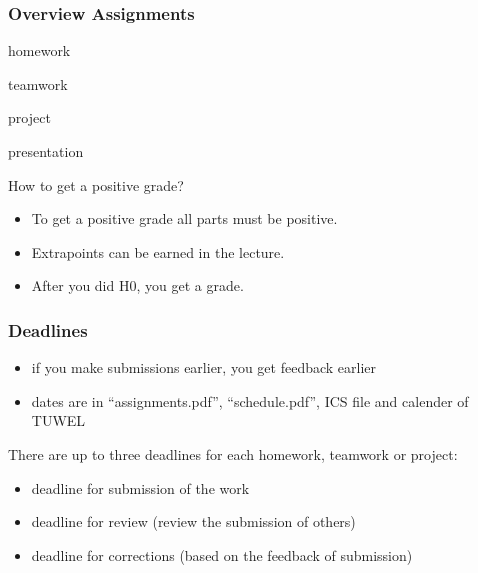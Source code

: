 \breakframe

\begin{frame}
	\frametitle{Overview Assignments}
	\begin{description}[<+-| alert@+>]
	\item[30\,\%:] homework
	\item[30\,\%:] teamwork
	\item[40\,\%:] project
	\item[0\,\%:] presentation
	\end{description}

	\pause[\thebeamerpauses]

	\begin{quest}
	How to get a positive grade?
	\end{quest}

	\pause

	\begin{itemize}[<+-| alert@+>]
	\item To get a positive grade all parts must be positive.
	\item Extrapoints can be earned in the lecture.
	\item After you did H0, you get a grade.
	\end{itemize}
\end{frame}

\begin{frame}
	\frametitle{Deadlines}

	\begin{itemize}[<+-| alert@+>]
	\item if you make submissions earlier, you get feedback earlier
	\item dates are in ``assignments.pdf'', ``schedule.pdf'', ICS file and calender of TUWEL
	\end{itemize}

	\pause[\thebeamerpauses]
	\vspace{1em}

	There are up to three deadlines for each homework, teamwork or project:

	\begin{itemize}[<+-| alert@+>]
	\item deadline for submission of the work
	\item deadline for review (review the submission of others)
	\item deadline for corrections (based on the feedback of submission)
	\end{itemize}
\end{frame}

